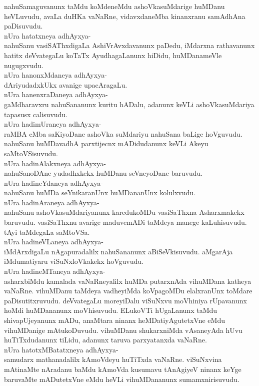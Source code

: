 \documentclass{article}
\begin{document}
nahuSamaguvanunx taMdu koMdeneMdu ashoVkasuMdarige huMDanu heVLuvudu, avaLa duHKa vaNaRne, vidavxdaneMba kinanxranu samAdhAna paDisuvudu.\\
nUra hatatxneya adhAyxya-\\
nahuSanu vasiSAThxdigaLa AshiVrAvxdavanunx paDedu, iMdarxna rathavanunx hatitx deVvategaLu koTaTx AyudhagaLanunx hiDidu, huMDanameVle nugugxvudu.\\
nUra hanonxMdaneya adhAyxya-\\
dAriyudadxkUkx avanige upacAragaLu.\\
nUra hanenxraDaneya adhAyxya-\\
gaMdharavxru nahuSananunx kuritu hADalu, adanunx keVLi ashoVkasuMdariya tapasusx calisuvudu.\\
nUra hadimUraneya adhAyxya-\\
raMBA eMba saKiyoDane ashoVka suMdariyu nahuSana baLige hoVguvudu. nahuSanu huMDavadhA parxtijecnx mADidudanunx keVLi Akeyu saMtoVSisuvudu.\\
nUra hadinAlakxneya adhAyxya-\\
nahuSanoDAne yudadhxkekx huMDanu seVneyoDane baruvudu.\\
nUra hadineYdaneya adhAyxya-\\
nahuSanu huMDa seYnikaranUnx huMDananUnx kolulxvudu.\\
nUra hadinAraneya adhAyxya-\\
nahuSanu ashoVkasuMdariyanunx karedukoMDu vasiSaThxna Asharxmakekx baruvudu. vasiSaThxnu avarige maduvemADi taMdeya manege kaLuhisuvudu. tAyi taMdegaLa saMtoVSa.\\
nUra hadineVLaneya adhAyxya-\\
iMdArxdigaLu nAgapuradalilx nahuSananunx aBiSeVkisuvudu. aMgarAja iMdumatiyaru viSuNxloVkakekx hoVguvudu.\\
nUra hadineMTaneya adhAyxya-\\
asharxbiMdu kamalada vaNaRneyalilx huMDa putarxnAda vihuMDana katheya vaNaRne. vihuMDanu taMdeya vadheyiMda koVpagoMDu elalxranUnx toMdare paDisutitxruvudu. deVvategaLu moreyiDalu viSuNxvu moVhiniya rUpavanunx hoMdi huMDananunx moVhisuvudu. ELukoVTi hUgaLanunx taMdu shivapUjeyanunx mADu, anaMtara ninanx heMDatiyAgutetxVne eMdu vihuMDanige mAtukoDuvudu. vihuMDanu shukarxniMda vAsaneyAda hUvu huTiTxdudanunx tiLidu, adanunx taruva parxyatanxda vaNaRne.\\
nUra hatotxMBatatxneya adhAyxya-\\
samudarx mathanadalilx kAmoVdeyu huTiTxda vaNaRne. viSuNxvina mAtinaMte nAradanu baMdu kAmoVda kusumavu tAnAgiyeV ninanx keYge baruvaMte mADutetxVne eMdu heVLi vihuMDananunx sumamxnirisuvudu.\\
\end{document}
